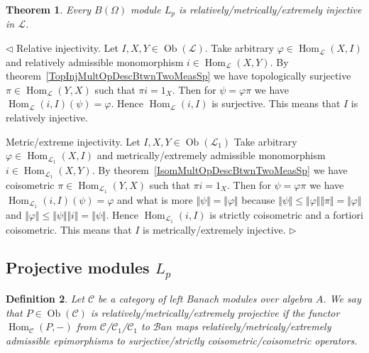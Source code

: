 \documentclass[12pt]{article}
\newtheorem{theorem}{Theorem}[subsection]
\newtheorem{definition}[theorem]{Definition}
\newenvironment{proof}{\par $\triangleleft$}{$\triangleright$}
\begin{document}
\begin{theorem} Every $B(\Omega)$ module $L_p$ is
    relatively/metrically/extremely injective in $\mathscr{L}$.
\end{theorem}
\begin{proof}
    Relative injectivity. Let $I,X,Y\in\operatorname{Ob}(\mathscr{L})$.
    Take arbitrary $\varphi\in\operatorname{Hom}_{\mathscr{L}}(X,I)$ and
    relatively admissible monomorphism
    $i\in\operatorname{Hom}_{\mathscr{L}}(X, Y)$. By
    theorem~\ref{TopInjMultOpDescBtwnTwoMeasSp} we have  topologically
    surjective $\pi\in\operatorname{Hom}_{\mathscr{L}}(Y, X)$ such
    that $\pi i=1_{X}$. Then for $\psi=\varphi\pi$ we have
    $\operatorname{Hom}_{\mathscr{L}}(i, I)(\psi)=\varphi$. Hence
    $\operatorname{Hom}_{\mathscr{L}}(i, I)$ is surjective. This means that
    $I$ is relatively injective.

    Metric/extreme injectivity. Let $I,X,Y\in\operatorname{Ob}(\mathscr{L}_1)$
    Take arbitrary $\varphi\in\operatorname{Hom}_{\mathscr{L}_1}(X, I)$ and
    metrically/extremely admissible monomorphism
    $i\in\operatorname{Hom}_{\mathscr{L}_1}(X, Y)$. By
    theorem~\ref{IsomMultOpDescBtwnTwoMeasSp} we have coisometric
    $\pi\in\operatorname{Hom}_{\mathscr{L}_1}(Y, X)$ such that
    $\pi i=1_{X}$. Then for $\psi=\varphi\pi$ we have
    $\operatorname{Hom}_{\mathscr{L}_1}(i, I)(\psi)=\varphi$ and what is
    more $\Vert\psi\Vert=\Vert\varphi\Vert$ because
    $\Vert\psi\Vert\leq\Vert\varphi\Vert\Vert\pi\Vert=\Vert\varphi\Vert$ and
    $\Vert\varphi\Vert\leq\Vert\psi\Vert\Vert i\Vert=\Vert\psi\Vert$. Hence
    $\operatorname{Hom}_{\mathscr{L}_1}(i,I)$ is strictly coisometric and a
    fortiori coisometric. This means that $I$ is metrically/extremely injective.
\end{proof}


\subsection{Projective modules \texorpdfstring{$L_p$}{Lp}}

\begin{definition} Let $\mathscr{C}$ be a category of left Banach modules over
    algebra $A$. We say that $P\in\operatorname{Ob}(\mathscr{C})$ is
    relatively/metrically/extremely projective if the functor
    $\operatorname{Hom}_{\mathscr{C}}(P,-)$ from
    $\mathscr{C}$/$\mathscr{C}_1$/$\mathscr{C}_1$ to $\mathscr{B}an$ maps
    relatively/metricaly/extremely admissible epimorphisms to
    surjective/strictly coisometric/coisometric operators.
\end{definition}
\end{document}
